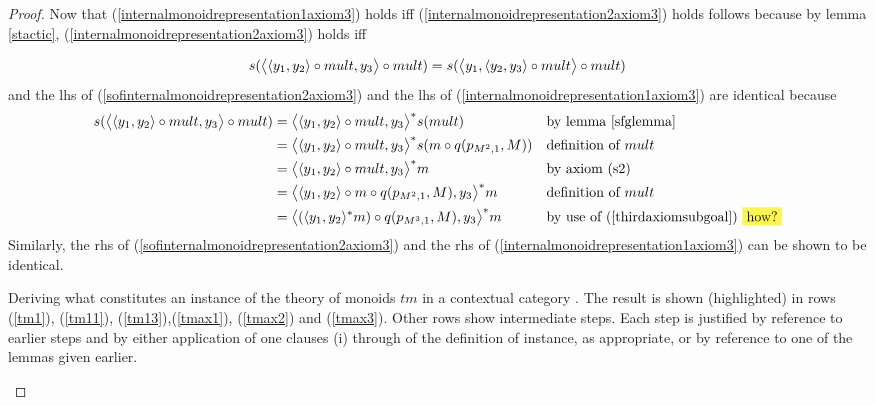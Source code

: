 \begin{proof}
Now that (\ref{internalmonoidrepresentation1axiom3}) holds iff (\ref{internalmonoidrepresentation2axiom3}) holds
follows because by lemma \ref{stactic}, (\ref{internalmonoidrepresentation2axiom3}) holds iff

\begin{equation}
\label{sofinternalmonoidrepresentation2axiom3}
s(\big \langle \langle y_1,y_2\rangle\circ mult,y_3 \big \rangle\circ mult)
=s(\big \langle y_1,\langle y_2,y_3\rangle \circ mult \big \rangle\circ mult)
\end{equation}
and the lhs of (\ref{sofinternalmonoidrepresentation2axiom3}) and the lhs of (\ref{internalmonoidrepresentation1axiom3}) 
are identical because
\begin{align*}
s(\bigtuple{\tuple{y_1,y_2}\circ mult,y_3}\circ mult) 
    &= \bigtuple{\tuple{y_1,y_2}\circ mult,y_3} ^* s(mult) && \mbox{by lemma \ref{sfglemma}} \\
		&= \bigtuple{\tuple{y_1,y_2}\circ mult,y_3} ^* s(\fmult \circ q(p_{\doubleM,1} , M)) && \mbox{definition of $mult$} \\
		&= \bigtuple{\tuple{y_1,y_2}\circ mult,y_3} ^* \fmult                                &&  \mbox{by axiom (s2)} \\
		&= \bigtuple{\tuple{y_1,y_2}\circ \fmult \circ q(p_{\doubleM,1} , M),y_3} ^* \fmult  
		                                                                    &&  \mbox{definition of $mult$} \\	
	  &= \bigtuple{(\tuple{y_1,y_2}^*\fmult)\circ q(p_{M^3,1},M),y_3} ^* \fmult 
		                                                                    &&  \mbox{by use of (\ref{thirdaxiomsubgoal}) \highlight{how?}}
\end{align*}
Similarly, the rhs of (\ref{sofinternalmonoidrepresentation2axiom3}) and the rhs of (\ref{internalmonoidrepresentation1axiom3}) 
can be shown to be identical.

\begin{table}[H]
\caption{Deriving what constitutes an instance of the theory of monoids $tm$ in a contextual category \catc.
The result is shown (highlighted) in rows (\ref{tm1}), (\ref{tm11}), (\ref{tm13}),(\ref{tmax1}), (\ref{tmax2}) and (\ref{tmax3}). Other rows 
show intermediate steps. Each step is justified by reference to earlier steps and by either application of one clauses (i) through  of the definition of instance, as appropriate, or by reference to one of the lemmas given earlier.}
\label{internalmonoidtable}


\end{table}
\end{proof}
